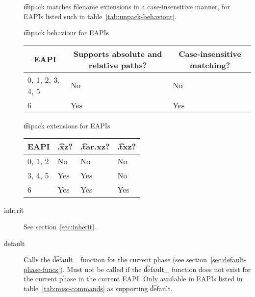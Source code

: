 \begin{description}
     \t{unpack} matches filename extensions in a case-insensitive
    manner, for EAPIs listed such in table~\ref{tab:unpack-behaviour}.

    \begin{centertable}{\t{unpack} behaviour for EAPIs}
        \label{tab:unpack-behaviour}
        \begin{tabular}{lll}
          \toprule
          \multicolumn{1}{c}{\textbf{EAPI}} &
          \multicolumn{1}{c}{\textbf{Supports absolute and relative paths?}} &
          \multicolumn{1}{c}{\textbf{Case-insensitive matching?}} \\
          \midrule
          0, 1, 2, 3, 4, 5  & No  & No  \\
          6                 & Yes & Yes \\
          \bottomrule
        \end{tabular}
    \end{centertable}

    \begin{centertable}{\t{unpack} extensions for EAPIs}
        \label{tab:unpack-extensions-table}
        \begin{tabular}{llll}
          \toprule
          \multicolumn{1}{c}{\textbf{EAPI}} &
          \multicolumn{1}{c}{\textbf{\t{.xz}?}} &
          \multicolumn{1}{c}{\textbf{\t{.tar.xz}?}} &
          \multicolumn{1}{c}{\textbf{\t{.txz}?}} \\
          \midrule
          0, 1, 2           & No  & No  & No  \\
          3, 4, 5           & Yes & Yes & No  \\
          6                 & Yes & Yes & Yes \\
          \bottomrule
        \end{tabular}
    \end{centertable}

\item[inherit] See section~\ref{sec:inherit}.

\item[default]
     Calls the \t{default\_} function for the current phase (see
    section~\ref{sec:default-phase-funcs}). Must not be called if the \t{default\_} function does
    not exist for the current phase in the current EAPI\@. Only available in EAPIs listed in
    table~\ref{tab:misc-commands} as supporting \t{default}.


\end{description}
